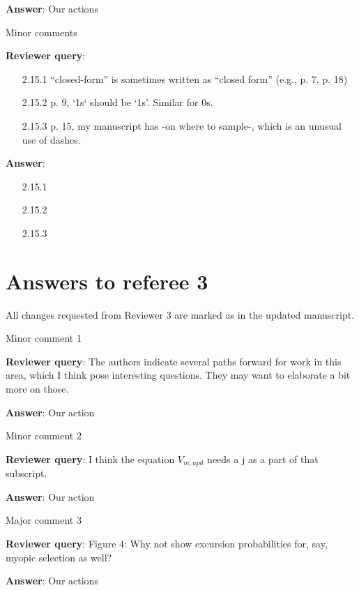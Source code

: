 \documentclass[a4paper]{article}
\newcounter{reviewer}
\def\reply{\textbf{Reviewer query}}
\def\action{\textbf{Answer}}
\newcommand{\trevcomment}[1]{{\color{violet}{\{Rev 3: #1\}}}}
\begin{document}
\begin{answers}
\action: Our actions

\item{Minor comments}\label{q26}

\reply: \begin{itemize}[noitemsep,topsep=0pt,parsep=0pt,partopsep=0pt]

\item[2.15.1] “closed-form” is sometimes written as “closed form” (e.g., p. 7, p. 18)

\item[2.15.2] p. 9, `1s` should be ‘1s’. Similar for 0s.

\item[2.15.3] p. 15, my manuscript has -on where to sample-, which is an unusual use of dashes.

\end{itemize}

\action:
\begin{itemize}[noitemsep,topsep=0pt,parsep=0pt,partopsep=0pt]

\item[2.15.1] 
\item[2.15.2] 
\item[2.15.3] 

\end{itemize}

\end{answers}
\section*{Answers to referee 3}
All changes requested from Reviewer 3 are marked as \trevcomment{violet text}
in the updated manuscript.

\setcounter{reviewer}{3}

\begin{answers}

\item{Minor comment 1}\label{q27}

\reply: The authors indicate several paths forward for work in this area, which I think pose interesting questions. They may want to elaborate
a bit more on those.

\action: Our action

\item{Minor comment 2}\label{q28}

\reply: I think the equation $V_{m,upd}$ needs a j as a part of that subscript.

\action: Our action

\item{Major comment 3}\label{q29}

\reply: Figure 4: Why not show excursion probabilities for, say, myopic selection as well?

\action: Our actions

\end{answers}
\end{document}
